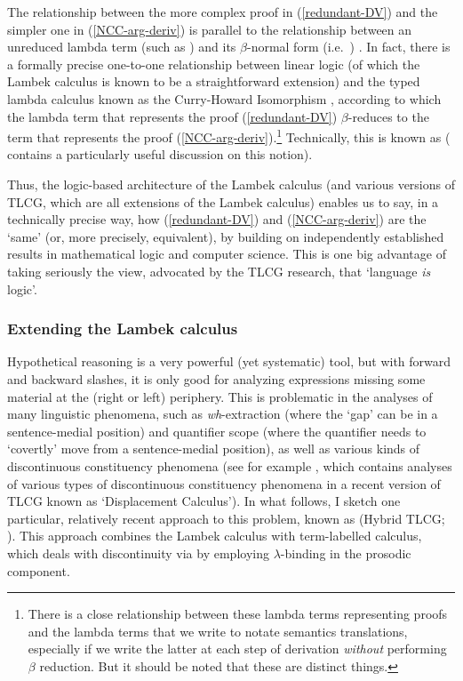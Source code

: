 \documentclass[output=paper]{langsci/langscibook}
\begin{document}
The relationship between the more complex proof in (\ref{redundant-DV}) and
the simpler one in (\ref{NCC-arg-deriv}) is parallel to the relationship
between an unreduced lambda term (such as \sem{  \lambda P [P(\trns{b})](R)]  }) %
{}%
and its
$\beta$-normal form (i.e.\  )%
{}%
{}. In fact, there is a formally precise
one-to-one relationship between linear logic (of which the Lambek calculus is known
to be a straightforward extension) and the typed lambda calculus known
as the Curry-Howard Isomorphism , according to which
the lambda term that represents the proof 
(\ref{redundant-DV}) $\beta$-reduces  to the term that represents the proof
(\ref{NCC-arg-deriv}).\footnote{There is a close relationship between these
lambda terms representing proofs and the lambda  terms that we write
to notate semantics translations, especially if we write the latter
at each step of derivation \emph{without} performing $\beta$ reduction. But
it should be noted that these are distinct things.}
Technically, this is known as 
(\citet{jaeger05} contains a particularly useful discussion on this notion). 

Thus, the logic-based architecture of the Lambek calculus (and various versions of
TLCG, which are all extensions of the Lambek calculus) enables us to say, in a
technically precise way, how (\ref{redundant-DV}) and (\ref{NCC-arg-deriv}) are
the `same' (or, more precisely, equivalent), by building on
independently established results in mathematical logic and computer
science. This is one big advantage of taking seriously the view,
advocated by the TLCG research, that `language \emph{is} logic'.


\subsubsection{Extending the Lambek calculus \label{sec:extending}}

Hypothetical reasoning is a very powerful (yet systematic) tool, but
with forward and backward slashes, it is only good for analyzing
expressions missing some material at the (right or left) periphery.
This is problematic in the analyses of many linguistic
phenomena, such as \textit{wh}-extraction (where the `gap' can be in a
sentence-medial position) and quantifier scope (where the
quantifier needs to `covertly' move from a sentence-medial position),
as well  as various kinds of discontinuous constituency phenomena
(see for example \citet{morrill-ea11}, which contains analyses of
various types of discontinuous constituency phenomena in a recent
version of TLCG known as `Displacement Calculus').
In what follows, I sketch one particular, relatively recent approach
to this problem, known as 
(Hybrid TLCG; \citealt{kubota-diss,kubota-NCC,kubota-levine-coord}). This approach
combines the Lambek calculus with  term-labelled calculus, which deals
with discontinuity via by employing $\lambda$-binding in the prosodic
component.
\end{document}
